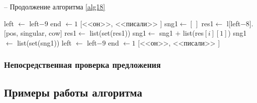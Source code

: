 \documentclass[main]{subfiles}
\begin{document}
\begin{algorithm}
	\caption{-- Продолжение алгоритма \ref{alg18}}\label{alg19}
	\begin{algorithmic}[1]
				\State left $\gets$ left$-9$
		\State end $\gets 1$
		\State \Return $[$<<он>>, <<писали>> $]$
		\EndIf
			\EndIf
			\State sng1$\gets [\,]$
			\State res1$\gets$ l$[$left$-8]$.$[$pos, singular, cow$]$
			\State res1$\gets$ list(set(res1))
			\State sng1$\gets$ sng1 $+$ list(res$[i][1]$)
			\EndIf
			\EndFor	
			\State sng1$\gets$ list(set(sng1))
			\State left $\gets$ left$-9$
			\State end $\gets 1$
			\State \Return $[$<<он>>, <<писали>> $]$
			\EndIf
			\EndIf
		\EndIf
		\EndWhile
		\EndIf
	\end{algorithmic}
\end{algorithm}
\subsubsection{Непосредственная проверка предложения}
\subsection{Примеры работы алгоритма}
\end{document}
